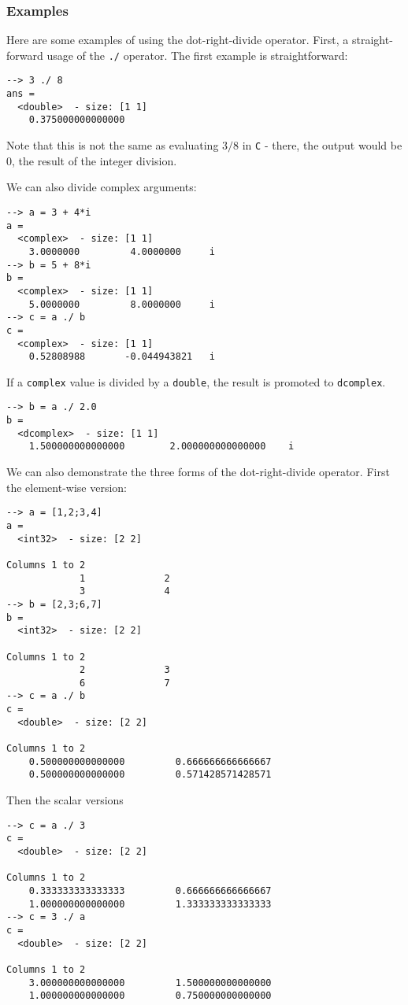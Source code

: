 \subsubsection{Examples}
Here are some examples of using the dot-right-divide operator.  First, a 
straight-forward usage of the \verb|./| operator.  The first example
is straightforward:
\begin{verbatim}
--> 3 ./ 8
ans =
  <double>  - size: [1 1]
    0.375000000000000
\end{verbatim}
Note that this is not the same as evaluating $3/8$ in \verb|C| - there,
the output would be $0$, the result of the integer division.

We can also divide complex arguments:
\begin{verbatim}
--> a = 3 + 4*i
a =
  <complex>  - size: [1 1]
    3.0000000         4.0000000     i
--> b = 5 + 8*i
b =
  <complex>  - size: [1 1]
    5.0000000         8.0000000     i
--> c = a ./ b
c =
  <complex>  - size: [1 1]
    0.52808988       -0.044943821   i
\end{verbatim}
If a \verb|complex| value is divided by a \verb|double|, the result is 
promoted to \verb|dcomplex|.
\begin{verbatim}
--> b = a ./ 2.0
b =
  <dcomplex>  - size: [1 1]
    1.500000000000000        2.000000000000000    i
\end{verbatim}
We can also demonstrate the three forms of the dot-right-divide operator.  First
the element-wise version:
\begin{verbatim}
--> a = [1,2;3,4]
a =
  <int32>  - size: [2 2]
  
Columns 1 to 2
             1              2
             3              4
--> b = [2,3;6,7]
b =
  <int32>  - size: [2 2]
  
Columns 1 to 2
             2              3
             6              7
--> c = a ./ b
c =
  <double>  - size: [2 2]
  
Columns 1 to 2
    0.500000000000000         0.666666666666667
    0.500000000000000         0.571428571428571
\end{verbatim}
Then the scalar versions
\begin{verbatim}
--> c = a ./ 3
c =
  <double>  - size: [2 2]
  
Columns 1 to 2
    0.333333333333333         0.666666666666667
    1.000000000000000         1.333333333333333
--> c = 3 ./ a
c =
  <double>  - size: [2 2]
  
Columns 1 to 2
    3.000000000000000         1.500000000000000
    1.000000000000000         0.750000000000000
\end{verbatim}
